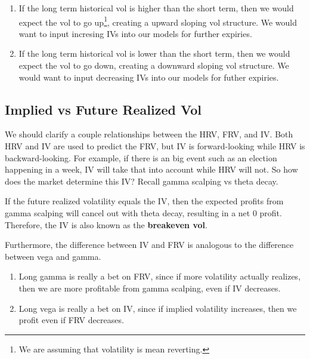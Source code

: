 \documentclass{article}
\begin{document}
    \begin{definition}
      \label{def:volatility-term-structure}
      \begin{enumerate}
        \item If the long term historical vol is higher than the short term, then we would expect the vol to go up\footnote{We are assuming that volatility is mean reverting. }, creating a upward sloping vol structure. We would want to input incresing IVs into our models for further expiries.
        \item If the long term historical vol is lower than the short term, then we would expect the vol to go down, creating a downward sloping vol structure. We would want to input decreasing IVs into our models for futher expiries.
      \end{enumerate}
    \end{definition}

  \subsection{Implied vs Future Realized Vol}

    We should clarify a couple relationships between the HRV, FRV, and IV. Both HRV and IV are used to predict the FRV, but IV is forward-looking while HRV is backward-looking. For example, if there is an big event such as an election happening in a week, IV will take that into account while HRV will not. So how does the market determine this IV? Recall gamma scalping vs theta decay. 

    \begin{theorem}
      \label{thm:iv-is-breakeven-vol}
      If the future realized volatility equals the IV, then the expected profits from gamma scalping will cancel out with theta decay, resulting in a net $0$ profit. Therefore, the IV is also known as the \textbf{breakeven vol}. 
    \end{theorem}

    Furthermore, the difference between IV and FRV is analogous to the difference between vega and gamma. 
    \begin{enumerate}
      \item Long gamma is really a bet on FRV, since if more volatility actually realizes, then we are more profitable from gamma scalping, even if IV decreases. 
      \item Long vega is really a bet on IV, since if implied volatility increases, then we profit even if FRV decreases. 
    \end{enumerate}
\end{document}
